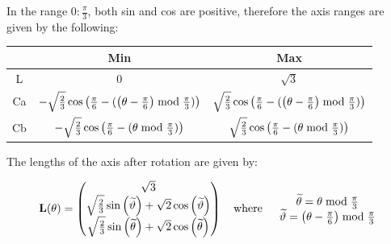 In the range $0:\frac{\pi}{3}$, both sin and cos are positive, therefore the axis ranges are given by the following:



\begin{tabular}{|c|c|c|}

  \hline


    & Min & Max \\ \hline

  L & \(0\) & \(\sqrt{3}\) \\

  Ca & \(- \sqrt{\frac{2}{3}} \cos \left(\frac{\pi}{6}-(\left(\theta -\frac{\pi}{6}\right) \bmod \frac{\pi }{3})\right) \)&\( \sqrt{\frac{2}{3}} \cos \left(\frac{\pi}{6}-(\left(\theta -\frac{\pi}{6}\right) \bmod \frac{\pi }{3})\right) \)\\

 Cb & \(-\sqrt{\frac{2}{3}} \cos \left(\frac{\pi}{6}-(\theta  \bmod \frac{\pi }{3})\right) \)&\( \sqrt{\frac{2}{3}} \cos \left(\frac{\pi}{6}-(\theta  \bmod \frac{\pi }{3})\right) \)\\

  \hline

\end{tabular}



The lengths of the axis after rotation are given by:



\begin{equation}\label{eq:L}

\mathbf{L}(\theta) =

\begin{pmatrix}

\sqrt{3} \\

 \sqrt{\frac{2}{3}} \sin \left(\widetilde{\vartheta}\right) + \sqrt{2} \cos \left(\widetilde{\vartheta}\right) \\  

\sqrt{\frac{2}{3}} \sin \left(\widetilde{\theta}\right) + \sqrt{2} \cos \left(\widetilde{\theta}\right) 

\end{pmatrix}

\quad \text{where}  \quad 

\begin{array}{c}

\widetilde{\theta} = \theta  \bmod \frac{\pi }{3} \\ 

\widetilde{\vartheta} = \left(\theta - \Pii{6}\right) \bmod \frac{\pi }{3}

\end{array}

\end{equation}



